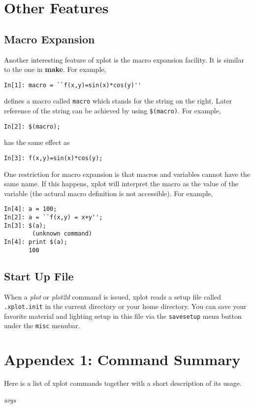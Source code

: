\section{Other Features}

\subsection{Macro Expansion}
Another interesting feature of xplot is the 
macro expansion facility. It is similar to the
one in {\bf make}. For example,
\begin{verbatim}
In[1]: macro = ``f(x,y)=sin(x)*cos(y)''
\end{verbatim}
defines a macro called \verb+macro+ which stands
for the string on the right. Later reference
of the string can be achieved by using 
\verb+$(macro)+. For example,
\begin{verbatim}
In[2]: $(macro);
\end{verbatim}
has the same effect as 
\begin{verbatim}
In[3]: f(x,y)=sin(x)*cos(y);
\end{verbatim}

One restriction for macro expansion is that 
macros and variables cannot have the same
name. If this happens, xplot will interpret
the macro as the value of the variable (the
actural macro definition is not accessible).
For example,
\begin{verbatim}
In[4]: a = 100;
In[2]: a = ``f(x,y) = x+y'';
In[3]: $(a);
        (unknown command)
In[4]: print $(a);
       100
\end{verbatim}


\subsection{Start Up File}
When a {\it plot} or {\it plot2d} command is 
issued, xplot reads a setup file
called \verb+.xplot.init+
in the current directory or your home directory.
You can save your favorite material and lighting
setup in this file via the \verb+savesetup+ menu
button under the \verb+misc+ menubar.

\section{Appendex 1: Command Summary}

Here is a list of xplot commands together with a
short description of its usage.

\vspace{8mm}
 {\it args }

